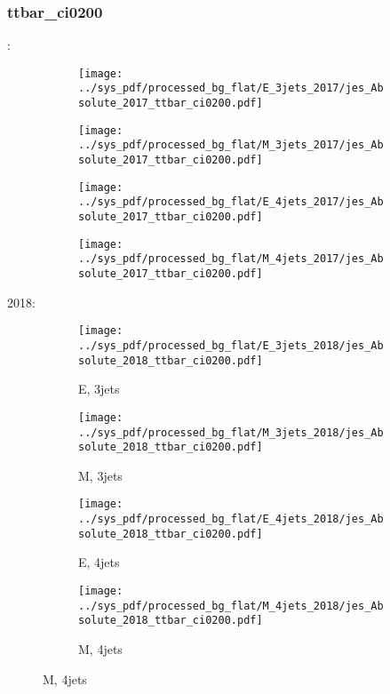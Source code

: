 \documentclass{beamer}
\begin{document}
\begin{frame}
\frametitle{ttbar_ci0200}
\fontsize{5}{1}:
\begin{figure}
\centering
\begin{subfigure}[b]{0.24\textwidth}
\texttt{[image: ../sys\_pdf/processed\_bg\_flat/E\_3jets\_2017/jes\_Absolute\_2017\_ttbar\_ci0200.pdf]}
\end{subfigure}
\begin{subfigure}[b]{0.24\textwidth}
\texttt{[image: ../sys\_pdf/processed\_bg\_flat/M\_3jets\_2017/jes\_Absolute\_2017\_ttbar\_ci0200.pdf]}
\end{subfigure}
\begin{subfigure}[b]{0.24\textwidth}
\texttt{[image: ../sys\_pdf/processed\_bg\_flat/E\_4jets\_2017/jes\_Absolute\_2017\_ttbar\_ci0200.pdf]}
\end{subfigure}
\begin{subfigure}[b]{0.24\textwidth}
\texttt{[image: ../sys\_pdf/processed\_bg\_flat/M\_4jets\_2017/jes\_Absolute\_2017\_ttbar\_ci0200.pdf]}
\end{subfigure}
\end{figure}
2018:
\begin{figure}
\centering
\begin{subfigure}[b]{0.24\textwidth}
\texttt{[image: ../sys\_pdf/processed\_bg\_flat/E\_3jets\_2018/jes\_Absolute\_2018\_ttbar\_ci0200.pdf]}
\captionsetup{font=tiny}
\caption{E, 3jets}
\end{subfigure}
\begin{subfigure}[b]{0.24\textwidth}
\texttt{[image: ../sys\_pdf/processed\_bg\_flat/M\_3jets\_2018/jes\_Absolute\_2018\_ttbar\_ci0200.pdf]}
\captionsetup{font=tiny}
\caption{M, 3jets}
\end{subfigure}
\begin{subfigure}[b]{0.24\textwidth}
\texttt{[image: ../sys\_pdf/processed\_bg\_flat/E\_4jets\_2018/jes\_Absolute\_2018\_ttbar\_ci0200.pdf]}
\captionsetup{font=tiny}
\caption{E, 4jets}
\end{subfigure}
\begin{subfigure}[b]{0.24\textwidth}
\texttt{[image: ../sys\_pdf/processed\_bg\_flat/M\_4jets\_2018/jes\_Absolute\_2018\_ttbar\_ci0200.pdf]}
\captionsetup{font=tiny}
\caption{M, 4jets}
\end{subfigure}
\end{figure}
\end{frame}
\end{document}
